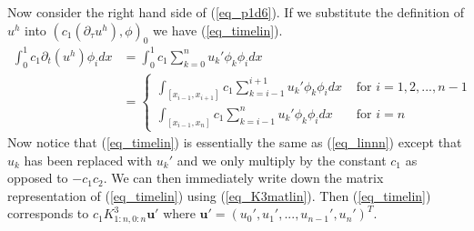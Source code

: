\documentclass[11pt,fleqn]{article}
\theoremstyle{defstyle}
\begin{document}
Now consider the right hand side of (\ref{eq_p1d6}). If we substitute the definition of $u^h$ into  $(c_1(\partial_{\tau}u^h),\phi)_0$ we have (\ref{eq_timelin}).
\begin{equation}
\begin{aligned}
\int_0^1 c_1\partial_t (u^h) \phi_i dx &= \int_0^1 c_1\sum_{k=0}^{n} u_k\prime \phi_k \phi_i dx \\
&= \begin{cases}
\int_{[x_{i-1},x_{i+1}]}c_1\sum_{k=i-1}^{i+1} u_k\prime \phi_k\phi_idx &\text{ for } i=1,2,..., n-1 \\
\int_{[x_{i-1},x_{n}]}c_1\sum_{k=i-1}^{n} u_k\prime \phi_k \phi_idx &\text{ for } i=n
\end{cases}
\end{aligned}
\label{eq_timelin}
\end{equation}
Now notice that (\ref{eq_timelin}) is essentially the same as (\ref{eq_linnn}) except that $u_k$ has been replaced with $u_k\prime$ and we only multiply by the constant $c_1$ as opposed to $-c_1c_2$. We can then immediately write down the matrix representation of (\ref{eq_timelin}) using (\ref{eq_K3matlin}). Then (\ref{eq_timelin}) corresponds to $c_1K^3_{1:n, 0:n}\mathbf{u}\prime$  where $\mathbf{u}\prime = \left(u_0\prime,u_1\prime,...,u_{n-1}\prime,u_n\prime \right)^T$.
\end{document}
